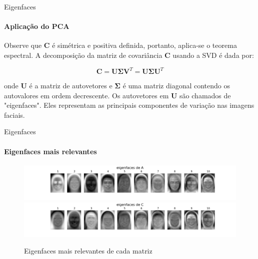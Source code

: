 \documentclass[xcolor=dvipsnames,t,aspectratio=169]{beamer} %
\begin{document}
\begin{frame}[c]{Eigenfaces}
\framesubtitle{Aplicação do PCA}
     Observe que $\boldsymbol{C}$ é simétrica e positiva definida, portanto, aplica-se o teorema espectral. A decomposição da matriz de covariância $\boldsymbol{C}$ usando a SVD é dada por:

            $$
            \boldsymbol{C} = \boldsymbol{U} \boldsymbol{\Sigma} \boldsymbol{V}^{T}  = \boldsymbol{U} \boldsymbol{\Sigma} \boldsymbol{U}^{T}
            $$

     onde $\boldsymbol{U}$ é a matriz de autovetores e $\boldsymbol{\Sigma}$ é uma matriz diagonal contendo os autovalores em ordem decrescente. Os autovetores em $\boldsymbol{U}$ são chamados de "eigenfaces". Eles representam as principais componentes de variação nas imagens faciais.
    
\end{frame}

\begin{frame}[c]{Eigenfaces}
\framesubtitle{Eigenfaces mais relevantes}

        \begin{figure}[H]
                  \centering
                  \includegraphics[width=1\textwidth]{img/MAIN_2.png}
                  \includegraphics[width=1\textwidth]{img/MAIN_3.png}
                  \caption{Eigenfaces mais relevantes de cada matriz}
                  \label{fig:exemplo}
            \end{figure}

\end{frame}
\end{document}
